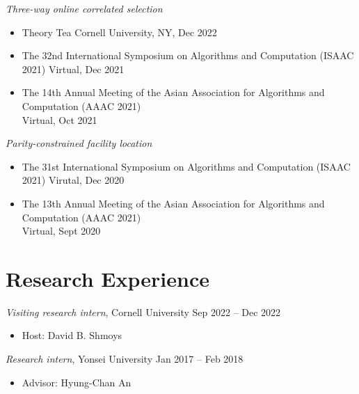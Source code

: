 \documentclass{cv}
\begin{document}
\textsl{Three-way online correlated selection}
\vspace{\killinitspace}
\begin{itemize}
\item Theory Tea \hfill Cornell University, NY, Dec 2022
\item The 32nd International Symposium on Algorithms and Computation (ISAAC 2021) \hfill Virtual, Dec 2021
\item The 14th Annual Meeting of the Asian Association for Algorithms and Computation (AAAC 2021) \\ \phantom{.} \hfill Virtual, Oct 2021
\end{itemize}

\textsl{Parity-constrained facility location}
\vspace{\killinitspace}
\begin{itemize}
\item The 31st International Symposium on Algorithms and Computation (ISAAC 2021) \hfill Virutal, Dec 2020
\item The 13th Annual Meeting of the Asian Association for Algorithms and Computation (AAAC 2021) \\ \phantom{.} \hfill Virtual, Sept 2020
\end{itemize}

\section{Research Experience}
\textsl{Visiting research intern}, Cornell University \hfill Sep 2022 -- Dec 2022
\vspace{\killinitspace}
\begin{itemize}
\item Host: David B. Shmoys
\end{itemize}

\textsl{Research intern}, Yonsei University \hfill Jan 2017 -- Feb 2018
\vspace{\killinitspace}
\begin{itemize}
\item Advisor: Hyung-Chan An
\end{itemize}

\end{document}
